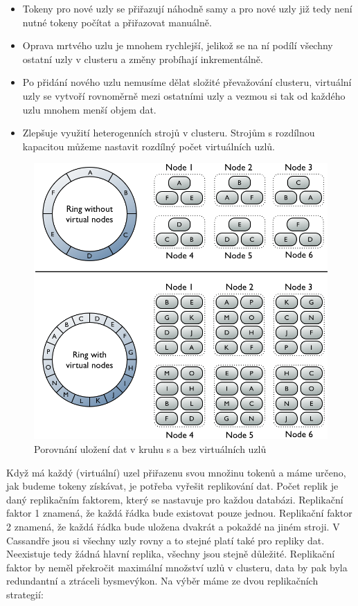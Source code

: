 \begin{itemize}
\item Tokeny pro nové uzly se přiřazují náhodně samy a pro nové uzly již tedy není nutné tokeny počítat a přiřazovat manuálně.
\item Oprava mrtvého uzlu je mnohem rychlejší, jelikož se na ní podílí všechny ostatní uzly v clusteru a změny probíhají inkrementálně.
\item Po přidání nového uzlu nemusíme dělat složité převažování clusteru, virtuální uzly se vytvoří rovnoměrně mezi ostatními uzly a vezmou si tak od každého uzlu mnohem menší objem dat.
\item Zlepšuje využití heterogenních strojů v clusteru. Strojům s rozdílnou kapacitou můžeme nastavit rozdílný počet virtuálních uzlů.
\end{itemize}

\begin{figure}[h]
\centering
\includegraphics[scale=0.5]{images/vnodes_compare}
\caption{Porovnání uložení dat v kruhu s a bez virtuálních uzlů}
\label{fig:vnodes}
\end{figure}

Když má každý (virtuální) uzel přiřazenu svou množinu tokenů a máme určeno, jak budeme tokeny získávat, je potřeba vyřešit replikování dat. Počet replik je daný replikačním faktorem, který se nastavuje pro každou databázi. Replikační faktor 1 znamená, že každá řádka bude existovat pouze jednou. Replikační faktor 2 znamená, že každá řádka bude uložena dvakrát a pokaždé na jiném stroji. V Cassandře jsou si všechny uzly rovny a to stejné platí také pro repliky dat. Neexistuje tedy žádná hlavní replika, všechny jsou stejně důležité. Replikační faktor by neměl překročit maximální množství uzlů v clusteru, data by pak byla redundantní a ztráceli bysmevýkon. Na výběr máme ze dvou replikačních strategií:


